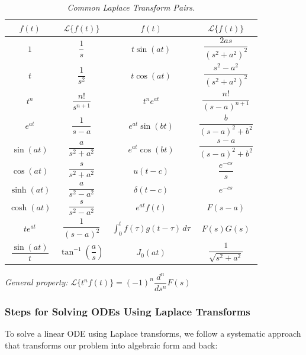 {
\renewcommand{\arraystretch}{2}
\begin{table}[H]
\centering
\caption{\textit{Common Laplace Transform Pairs.}}
\label{table:laplace_transforms}
\begin{tabular}{|c|c||c|c|}
\hline
\(f(t)\) & \(\mathcal{L}\{f(t)\}\) & \(f(t)\) & \(\mathcal{L}\{f(t)\}\) \\ \hline
\(1\) & \(\dfrac{1}{s}\) & \(t\sin(at)\) & \(\dfrac{2as}{(s^2+a^2)^2}\) \\ \hline
\(t\) & \(\dfrac{1}{s^2}\) & \(t\cos(at)\) & \(\dfrac{s^2-a^2}{(s^2+a^2)^2}\) \\ \hline
\(t^n\) & \(\dfrac{n!}{s^{n+1}}\) & \(t^ne^{at}\) & \(\dfrac{n!}{(s-a)^{n+1}}\) \\ \hline
\(e^{at}\) & \(\dfrac{1}{s-a}\) & \(e^{at}\sin(bt)\) & \(\dfrac{b}{(s-a)^2+b^2}\) \\ \hline
\(\sin(at)\) & \(\dfrac{a}{s^2+a^2}\) & \(e^{at}\cos(bt)\) & \(\dfrac{s-a}{(s-a)^2+b^2}\) \\ \hline
\(\cos(at)\) & \(\dfrac{s}{s^2+a^2}\) & \(u(t-c)\) & \(\dfrac{e^{-cs}}{s}\) \\ \hline
\(\sinh(at)\) & \(\dfrac{a}{s^2-a^2}\) & \(\delta(t-c)\) & \(e^{-cs}\) \\ \hline
\(\cosh(at)\) & \(\dfrac{s}{s^2-a^2}\) & \(e^{at}f(t)\) & \(F(s-a)\) \\ \hline
\(te^{at}\) & \(\dfrac{1}{(s-a)^2}\) & \(\displaystyle\int_{0}^t\! f(\tau)g(t\!-\!\tau)\,d\tau\) & \(F(s)G(s)\) \\ \hline
\(\dfrac{\sin(at)}{t}\) & \(\tan^{-1}\!\left(\dfrac{a}{s}\right)\) & \(J_0(at)\) & \(\dfrac{1}{\sqrt{s^2+a^2}}\) \\ \hline
\end{tabular}

\medskip
\textit{General property:} $\mathcal{L}\{t^n f(t)\} = (-1)^n \dfrac{d^n}{ds^n} F(s)$
\end{table}
}
\subsubsection*{Steps for Solving ODEs Using Laplace Transforms}

To solve a linear ODE using Laplace transforms, we follow a systematic approach that transforms our problem into algebraic form and back:

